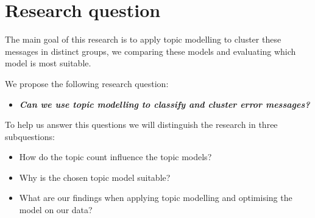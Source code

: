 \begin{comment}

Topic modelling is a hot topic in data science. System logs are used as source for the detection of problems in large computer systems. While domain experts can be used to detect and fix the problems detected, this can be difficult and time consuming. Machine learning techniques like topic modelling make it possible to develop models to extract these latent patterns from these system logs. While topic modelling is normally used in for large text corpera, recent research in the field of short text clustering and twitter tweets clustering are similar enough to by applicable for system logs. An interesting application which has not yet been touched a lot through unsupervised machine learning techniques.

\end{comment}


\section{Research question}\label{introduction:Researchquestion}
The main goal of this research is to apply topic modelling to cluster these messages in distinct groups, we comparing these models and evaluating which model is most suitable.

\noindent We propose the following research question: 
\begin{itemize}
    \item \textbf{\textit{Can we use topic modelling to classify and cluster error messages?}}
\end{itemize}

\noindent To help us answer this questions we will distinguish the research in three subquestions:
\begin{itemize}
    \item How do the topic count influence the topic models?
    \item Why is the chosen topic model suitable?
    \item What are our findings when applying topic modelling and optimising the model on our data?
\end{itemize}

\begin{comment}
What are the optimal parameters?

What are the pro's and con's of using LDA?

subquestions:
Why is LDA suitable for this type of data 

How do the parameters influence the models performance?

What are the pro's and con's of using LDA?

What other methods are available to solve this error clustering?


\end{comment}


